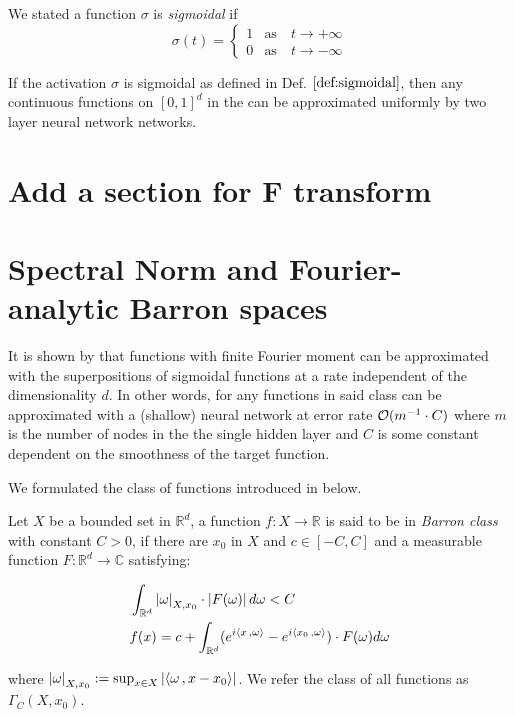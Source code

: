 \begin{definition}\label{def:sigmoidal}
    We stated a function $\sigma$ is \textit{sigmoidal} if
    \begin{equation}
        \sigma(t) =
        \begin{cases}
            1 & \text{as} \quad t \to +\infty \\
            0 & \text{as} \quad t \to -\infty
        \end{cases}
    \end{equation}
\end{definition}

\begin{theorem}\label{thm:uat}
    \cite[Theorem 5]{cybenkoApproximationSuperpositionsSigmoidal1989}
    If the activation $\sigma$ is sigmoidal as defined in Def. $\ref{def:sigmoidal}$, then any continuous functions on
    $[0, 1]^d$ in the can be approximated uniformly by two layer neural network
    networks.
\end{theorem}


\section{Add a section for F transform}

\section{Spectral Norm and Fourier-analytic Barron spaces}
\label{sec:spectral_norm}

It is shown by \cite{barronUniversalApproximationBounds1993} that functions with
finite Fourier moment can be approximated with the superpositions of sigmoidal
functions at a rate independent of the dimensionality $d$. In other words, for
any functions in said class can be approximated with a (shallow) neural network
at error rate $\mathcal{O}(m^{-1} \cdot C)$ where $m$ is the number of nodes in the
the single hidden layer and $C$ is some constant dependent on the smoothness of
the target function.

We formulated the class of functions introduced in
\cite{barronNeuralNetApproximation1992, barronUniversalApproximationBounds1993}
below.

\begin{definition}
    Let $X$ be a bounded set in $\mathbb{R}^d$, a function $f: X \to \mathbb{R}$
    is said to be in \textit{Barron class} with constant $C > 0$, if there are
    $x_0$ in $X$ and $c \in [-C, C]$ and a measurable function $F: \mathbb{R}^d
        \to \mathbb{C}$ satisfying:

    \begin{align}
         & \int_{\mathbb{R}^d} \left| \omega \right|_{X, x_0} \cdot \left| F(\omega) \right| d\omega < C                            \\
         & f(x) = c + \int_{\mathbb{R}^d} (e^{i\left\langle x\, , \omega \right\rangle} - e^{i\left\langle x_0\, , \omega \right\rangle}) \cdot F(\omega) d\omega
    \end{align}

    where $\left| \omega \right|_{X, x_0} := \sup_{x\in X}\left| \left\langle \omega\, , x - x_0 \right\rangle \right|$.
    We refer the class of all functions as $\Gamma_C(X, x_0)$.
\end{definition}

